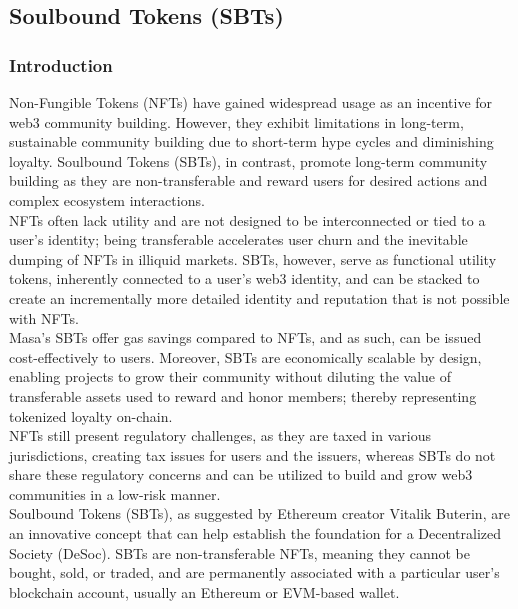\documentclass{article}
\begin{document}
\subsection{Soulbound Tokens (SBTs)}
\subsubsection{Introduction}
Non-Fungible Tokens (NFTs) have gained widespread usage as an incentive for web3 community building. However, they exhibit limitations in long-term, sustainable community building due to short-term hype cycles and diminishing loyalty. Soulbound Tokens (SBTs), in contrast, promote long-term community building as they are non-transferable and reward users for desired actions and complex ecosystem interactions. 
\\
\newline
NFTs often lack utility and are not designed to be interconnected or tied to a user's identity; being transferable accelerates user churn and the inevitable dumping of NFTs in illiquid markets. SBTs, however, serve as functional utility tokens, inherently connected to a user's web3 identity, and can be stacked to create an incrementally more detailed identity and reputation that is not possible with NFTs. 
\\
\newline
Masa’s SBTs offer gas savings compared to NFTs, and as such, can be issued cost-effectively to users. Moreover, SBTs are economically scalable by design, enabling projects to grow their community without diluting the value of transferable assets used to reward and honor members; thereby representing tokenized loyalty on-chain.
\\
\newline
NFTs still present regulatory challenges, as they are taxed in various jurisdictions, creating tax issues for users and the issuers, whereas SBTs do not share these regulatory concerns and can be utilized to build and grow web3 communities in a low-risk manner.
\\
\newline
Soulbound Tokens (SBTs), as suggested by Ethereum creator Vitalik Buterin, are an innovative concept that can help establish the foundation for a Decentralized Society (DeSoc). SBTs are non-transferable NFTs, meaning they cannot be bought, sold, or traded, and are permanently associated with a particular user's blockchain account, usually an Ethereum or EVM-based wallet.
\\
\newline
\end{document}
